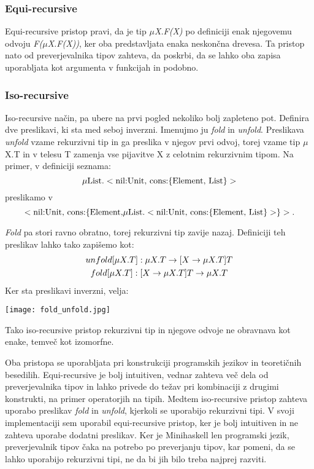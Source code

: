 \documentclass[a4paper]{report}
\begin{document}
\subsubsection{Equi-recursive}
Equi-recursive pristop pravi, da je tip \emph{\(\mu\)X.F(X)} po definiciji enak njegovemu odvoju \emph{F(\(\mu\)X.F(X))}, ker oba predstavljata enaka neskončna drevesa. Ta pristop nato od 
preverjevalnika tipov zahteva, da poskrbi, da se lahko oba zapisa uporabljata kot argumenta v funkcijah in podobno.

\subsubsection{Iso-recursive}
Iso-recursive način, pa ubere na prvi pogled nekoliko bolj zapleteno pot. Definira dve preslikavi, ki sta med seboj inverzni. Imenujmo ju \emph{fold} in \emph{unfold}. Preslikava 
\emph{unfold} vzame rekurzivni tip in ga preslika v njegov prvi odvoj, torej vzame tip \(\mu\)X.T in v telesu T zamenja vse pijavitve X z celotnim rekurzivnim tipom. Na primer, v definiciji 
seznama: 
\begin{equation}
    \mu \text{List.}<\text{nil:Unit, cons:}\{\text{Element, List}\}> \notag
\end{equation}
preslikamo v
\begin{equation}
    <\text{nil:Unit, cons:}\{\text{Element,} \mu \text{List.}<\text{nil:Unit, cons:}\{\text{Element, List}\}>\}>. \notag
\end{equation}
  
\emph{Fold} pa stori ravno obratno, torej rekurzivni tip zavije nazaj. Definiciji teh preslikav lahko tako zapišemo kot:
\begin{gather}
    unfold[\mu X.T]: \mu X.T \rightarrow [X \rightarrow \mu X.T] T \notag\\
    fold[\mu X.T]: [X \rightarrow \mu X.T] T \rightarrow \mu X.T \notag
\end{gather}
Ker sta preslikavi inverzni, velja:

\begin{center}
\texttt{[image: fold\_unfold.jpg]}
\end{center}

Tako iso-recursive pristop rekurzivni tip in njegove odvoje ne obravnava kot enake, temveč kot izomorfne.

Oba pristopa se uporabljata pri konstrukciji programskih jezikov in teoretičnih besedilih. Equi-recursive je bolj intuitiven, vednar zahteva več dela od preverjevalnika tipov in 
lahko privede do težav pri kombinaciji z drugimi konstrukti, na primer operatorjih na tipih. Medtem iso-recursive pristop zahteva uporabo preslikav \emph{fold} in \emph{unfold}, kjerkoli 
se uporabijo rekurzivni tipi. V svoji implementaciji sem uporabil equi-recursive pristop, ker je bolj intuitiven in ne zahteva uporabe dodatni preslikav. Ker je Minihaskell len programski 
jezik, preverjevalnik tipov čaka na potrebo po preverjanju tipov, kar pomeni, da se lahko uporabijo rekurzivni tipi, ne da bi jih bilo treba najprej razviti.
\end{document}
